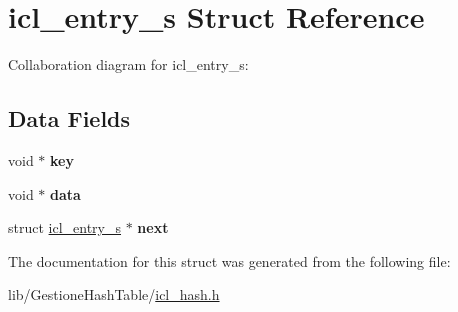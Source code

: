 \hypertarget{structicl__entry__s}{}\section{icl\+\_\+entry\+\_\+s Struct Reference}
\label{structicl__entry__s}


Collaboration diagram for icl\+\_\+entry\+\_\+s\+:
\subsection*{Data Fields}
\begin{DoxyCompactItemize}
\item 
\mbox{\label{structicl__entry__s_ab5c000aec752f2206131e183daf5efbf}} 
void $\ast$ {\bfseries key}
\item 
\mbox{\label{structicl__entry__s_a735984d41155bc1032e09bece8f8d66d}} 
void $\ast$ {\bfseries data}
\item 
\mbox{\label{structicl__entry__s_a5c42f35ed4968a9e686adb272ea4650b}} 
struct \hyperlink{structicl__entry__s}{icl\+\_\+entry\+\_\+s} $\ast$ {\bfseries next}
\end{DoxyCompactItemize}


The documentation for this struct was generated from the following file\+:\begin{DoxyCompactItemize}
\item 
lib/\+Gestione\+Hash\+Table/\hyperlink{icl__hash_8h}{icl\+\_\+hash.\+h}\end{DoxyCompactItemize}
